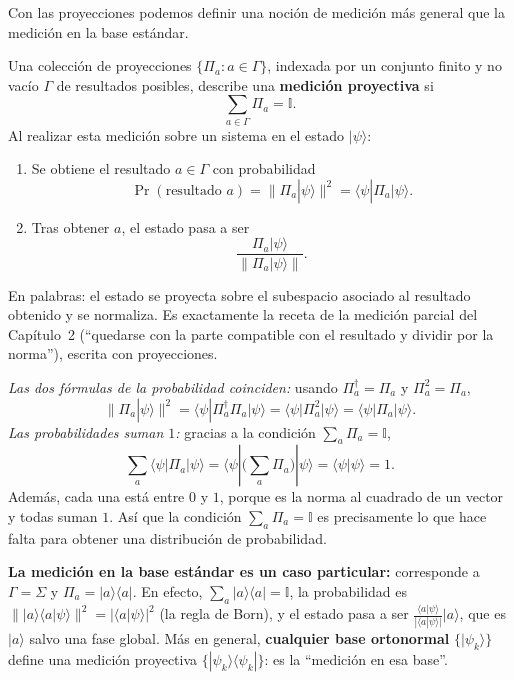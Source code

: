 \documentclass[11pt, a4paper, twoside, openright]{report}
\begin{document}
\noindent Con las proyecciones podemos definir una noción de medición más general que la medición en la base estándar.

\begin{tcolorbox}[colback=teal!5!white,colframe=teal!75!black,title=\textbf{Definición: Medición proyectiva}]
Una colección de proyecciones $\{\Pi_a: a\in\Gamma\}$, indexada por un conjunto finito y no vacío $\Gamma$ de resultados posibles, describe una \textbf{medición proyectiva} si
\[ \sum_{a\in\Gamma}\Pi_a = \mathbb{I}. \]
Al realizar esta medición sobre un sistema en el estado $|\psi\rangle$:
\begin{enumerate}
    \item Se obtiene el resultado $a\in\Gamma$ con probabilidad
    \[ \Pr(\text{resultado } a) = \big\|\Pi_a|\psi\rangle\big\|^2 = \langle\psi|\Pi_a|\psi\rangle. \]
    \item Tras obtener $a$, el estado pasa a ser
    \[ \frac{\Pi_a|\psi\rangle}{\|\Pi_a|\psi\rangle\|}. \]
\end{enumerate}
\end{tcolorbox}

\noindent En palabras: el estado se proyecta sobre el subespacio asociado al resultado obtenido y se normaliza. Es exactamente la receta de la medición parcial del Capítulo~2 (``quedarse con la parte compatible con el resultado y dividir por la norma''), escrita con proyecciones.

\begin{tcolorbox}[colback=gray!5!white,colframe=gray!75!black,title=\textbf{Por qué la definición tiene sentido}]
\textit{Las dos fórmulas de la probabilidad coinciden:} usando $\Pi_a^\dagger = \Pi_a$ y $\Pi_a^2 = \Pi_a$,
\[ \|\Pi_a|\psi\rangle\|^2 = \langle\psi|\Pi_a^\dagger\Pi_a|\psi\rangle = \langle\psi|\Pi_a^2|\psi\rangle = \langle\psi|\Pi_a|\psi\rangle. \]
\textit{Las probabilidades suman $1$:} gracias a la condición $\sum_a\Pi_a = \mathbb{I}$,
\[ \sum_a\langle\psi|\Pi_a|\psi\rangle = \langle\psi|\Big(\sum_a\Pi_a\Big)|\psi\rangle = \langle\psi|\psi\rangle = 1. \]
Además, cada una está entre $0$ y $1$, porque es la norma al cuadrado de un vector y todas suman $1$. Así que la condición $\sum_a\Pi_a = \mathbb{I}$ es precisamente lo que hace falta para obtener una distribución de probabilidad.
\end{tcolorbox}

\noindent \textbf{La medición en la base estándar es un caso particular:} corresponde a $\Gamma = \Sigma$ y $\Pi_a = |a\rangle\langle a|$. En efecto, $\sum_a|a\rangle\langle a| = \mathbb{I}$, la probabilidad es $\||a\rangle\langle a|\psi\rangle\|^2 = |\langle a|\psi\rangle|^2$ (la regla de Born), y el estado pasa a ser $\frac{\langle a|\psi\rangle}{|\langle a|\psi\rangle|}|a\rangle$, que es $|a\rangle$ salvo una fase global. Más en general, \textbf{cualquier base ortonormal} $\{|\psi_k\rangle\}$ define una medición proyectiva $\{|\psi_k\rangle\langle\psi_k|\}$: es la ``medición en esa base''.
\end{document}
